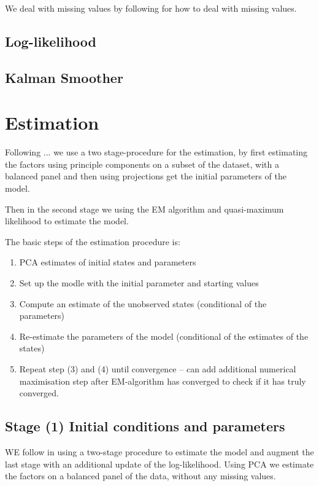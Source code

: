 \documentclass[12pt]{article}
\begin{document}
\begin{appendices}
We deal with missing values by following \cite{DurbinKoopman2012} for how to deal with missing values.

\subsection{Log-likelihood}


\subsection{Kalman Smoother}

\section{Estimation}

Following ... we use a two stage-procedure for the estimation, by first estimating the factors using principle components on a subset of the dataset, with a balanced panel and then using projections get the initial parameters of the model.

Then in the second stage we using the EM algorithm and quasi-maximum likelihood to estimate the model.

The basic steps of the estimation procedure is:
\begin{enumerate}
	\item 	PCA estimates of initial states and parameters
	\item 	Set up the modle with the initial parameter and starting values
	\item 	Compute an estimate of the unobserved states (conditional of the parameters)
	\item 	Re-estimate the parameters of the model (conditional of the estimates of the states)
	\item 	Repeat step (3) and (4) until convergence -- can add additional numerical maximisation step after EM-algorithm has converged to check if it has truly converged.
\end{enumerate}

\subsection{Stage (1) Initial conditions and parameters}

WE follow \cite{DozGiannoneReichlin2011} in using a two-stage procedure to estimate the model and augment the last stage with an additional update of the log-likelihood.
Using PCA we estimate the factors on a balanced panel of the data, without any missing values.


\end{appendices}
\end{document}
